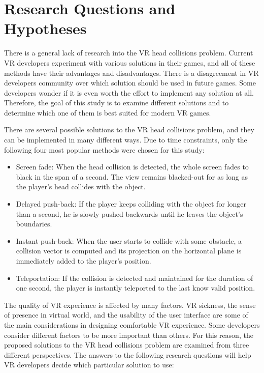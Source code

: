 \section{Research Questions and Hypotheses}

There is a general lack of research into the VR head collisions problem. Current VR developers experiment with various solutions in their games, and all of these methods have their advantages and disadvantages. There is a disagreement in VR developers community over which solution should be used in future games. Some developers wonder if it is even worth the effort to implement any solution at all. Therefore, the goal of this study is to examine different solutions and to determine which one of them is best suited for modern VR games.
 
There are several possible solutions to the VR head collisions problem, and they can be implemented in many different ways. Due to time constraints, only the following four most popular methods were chosen for this study:

\begin{itemize}
\item Screen fade: When the head collision is detected, the whole screen fades to black in the span of a second. The view remains blacked-out for as long as the player's head collides with the object.
\item Delayed push-back: If the player keeps colliding with the object for longer than a second, he is slowly pushed backwards until he leaves the object's boundaries.
\item Instant push-back: When the user starts to collide with some obstacle, a collision vector is computed and its projection on the horizontal plane is immediately added to the player's position.
\item Teleportation: If the collision is detected and maintained for the duration of one second, the player is instantly teleported to the last know valid position. 
\end{itemize}

The quality of VR experience is affected by many factors. VR sickness, the sense of presence in virtual world, and the usability of the user interface are some of the main considerations in designing comfortable VR experience. Some developers consider different factors to be more important than others. For this reason, the proposed solutions to the VR head collisions problem are examined from three different perspectives. The answers to the following research questions will help VR developers decide which particular solution to use:


